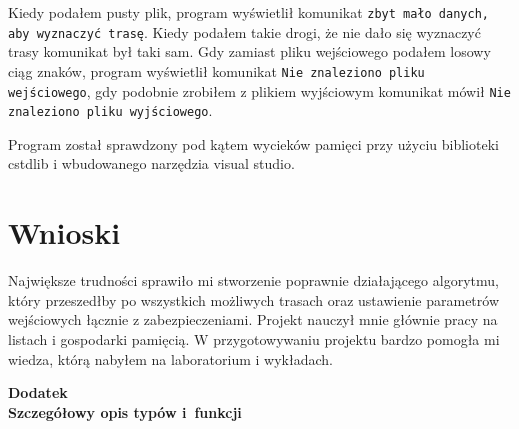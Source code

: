 \documentclass[12pt,a4paper,twoside]{article}
\let\oldmarginpar\marginpar
\renewcommand\marginpar[1]{%
  {\linespread{0.85}\normalfont\scriptsize%
\oldmarginpar[\hspace{1cm}\begin{minipage}{3cm}\raggedleft\scriptsize\color{black}\textsf{#1}\end{minipage}]%
{\hspace{0cm}\begin{minipage}{3cm}\raggedright\scriptsize\color{black}\textsf{#1}\end{minipage}}%
}%
}
\begin{document}
Kiedy podałem pusty plik, program wyświetlił komunikat \texttt{zbyt mało danych, aby wyznaczyć trasę}. Kiedy podałem takie drogi, że nie dało się wyznaczyć trasy komunikat był taki sam. 
Gdy zamiast pliku wejściowego podałem losowy ciąg znaków, program wyświetlił komunikat \texttt{Nie znaleziono pliku wejściowego}, gdy podobnie zrobiłem z plikiem wyjściowym komunikat mówił \texttt{Nie znaleziono pliku wyjściowego}.

Program został sprawdzony pod kątem wycieków pamięci przy użyciu biblioteki cstdlib i wbudowanego narzędzia visual studio.

%



\section{Wnioski}
\marginpar{}
Największe trudności sprawiło mi stworzenie poprawnie działającego algorytmu, który przeszedłby po wszystkich możliwych trasach oraz ustawienie parametrów wejściowych łącznie z zabezpieczeniami. Projekt nauczył mnie głównie pracy na listach i gospodarki pamięcią. W przygotowywaniu projektu bardzo pomogła mi wiedza, którą nabyłem na laboratorium i wykładach. 

 
\begin{filecontents}{bibliografia.bib}

}
\end{filecontents}




 
\cleardoublepage

\rule{0cm}{0cm}

\vfill

\begin{center}
\Huge\bfseries Dodatek\\Szczegółowy opis typów i~funkcji\par
\end{center}

\vfill 

\rule{0cm}{0cm}
\end{document}

